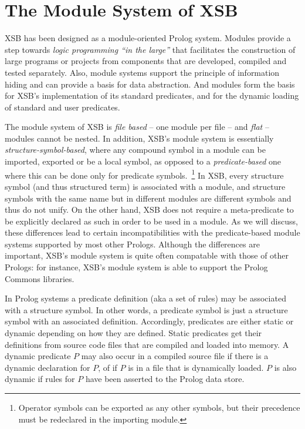 
\section{The Module System of XSB} \label{Modules}

XSB has been designed as a module-oriented Prolog system.  Modules
provide a step towards {\em logic programming ``in the large''} that
facilitates the construction of large programs or projects from
components that are developed, compiled and tested separately.  Also,
module systems support the principle of information hiding and can
provide a basis for data abstraction.  And modules form the basis for
XSB's implementation of its standard predicates, and for the dynamic
loading of standard and user predicates.

The module system of XSB is {\em file based} -- one module per file --
and {\em flat} -- modules cannot be nested.  In addition, XSB's module
system is essentially {\em structure-symbol-based}, where any compound
symbol in a module can be imported, exported or be a local symbol, as
opposed to a {\em predicate-based} one where this can be done only for
predicate symbols.~\footnote{Operator symbols can be exported as any
  other symbols, but their precedence must be redeclared in the
  importing module.}  In XSB, every structure symbol (and thus
structured term) is associated with a module, and structure symbols
with the same name but in different modules are different symbols and
thus do not unify.  On the other hand, XSB does not require a
meta-predicate to be explicitly declared as such in order to be used
in a module.  As we will discuss, these differences lead to certain
incompatibilities with the predicate-based module systems supported by
most other Prologs.  Although the differences are important, XSB's
module system is quite often compatable with those of other Prologs:
for instance, XSB's module system is able to support the Prolog
Commons libraries.

In Prolog systems a predicate definition (aka a set of rules) may be
associated with a structure symbol.  In other words, a predicate
symbol is just a structure symbol with an associated definition.
Accordingly, predicates are either static or dynamic depending on how
they are defined.  Static predicates get their definitions from source
code files that are compiled and loaded into memory.  A dynamic
predicate $P$ may also occur in a compiled source file if there is a
dynamic declaration for $P$, of if $P$ is in a file that is
dynamically loaded.  $P$ is also dynamic if rules for $P$ have been
asserted to the Prolog data store.

